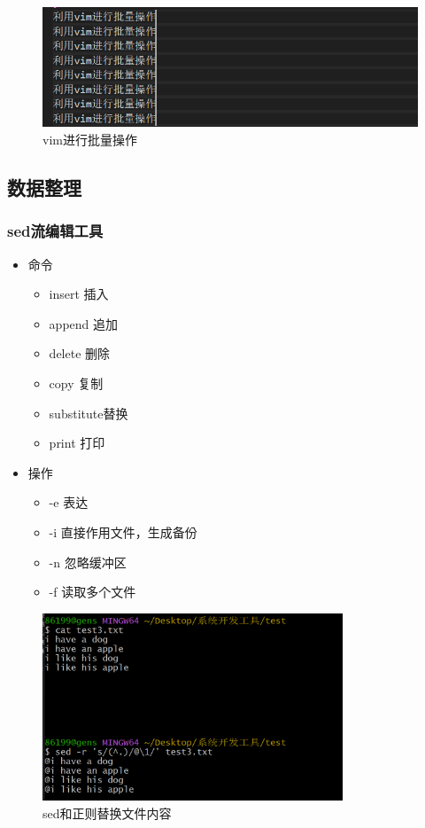 \documentclass[a4paper,12pt]{article}
\begin{document}
\begin{figure}[h]
    \centering
    \includegraphics[width=1\textwidth]{vim.png}
    \caption{vim进行批量操作}
    
\end{figure}
\subsection{\color{red}数据整理}
\subsubsection{\color{green}sed流编辑工具}
\begin{itemize}
    \item 命令
        \begin{itemize}
            \item insert 插入
            \item append 追加
            \item delete 删除 
            \item copy 复制
            \item substitute替换
            \item print 打印
        \end{itemize}
    \item 操作
        \begin{itemize}
            \item -e 表达
            \item -i 直接作用文件，生成备份
            \item -n 忽略缓冲区
            \item -f 读取多个文件
        \end{itemize}
\end{itemize}
\begin{figure}[h]
    \centering
    \includegraphics[width=0.8\textwidth]{sed.png}
    \caption{sed和正则替换文件内容}
\end{figure}
\end{document}

